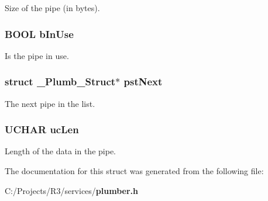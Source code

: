 Size of the pipe (in bytes). 
\subsubsection[{bInUse}]{\setlength{\rightskip}{0pt plus 5cm}BOOL {\bf bInUse}}\label{struct___plumb___struct_aea6d1ac949d280da0302e9de4fe6c5ab}


Is the pipe in use. 
\subsubsection[{pstNext}]{\setlength{\rightskip}{0pt plus 5cm}struct {\bf \_\-Plumb\_\-Struct}$\ast$ {\bf pstNext}}\label{struct___plumb___struct_aaf3c877de1633bf8e27de482b3a63512}


The next pipe in the list. 
\subsubsection[{ucLen}]{\setlength{\rightskip}{0pt plus 5cm}UCHAR {\bf ucLen}}\label{struct___plumb___struct_a4ab8dd057ce4d5f579456c1ca20d6e88}


Length of the data in the pipe. 

The documentation for this struct was generated from the following file:\begin{DoxyCompactItemize}
\item 
C:/Projects/R3/services/{\bf plumber.h}\end{DoxyCompactItemize}
